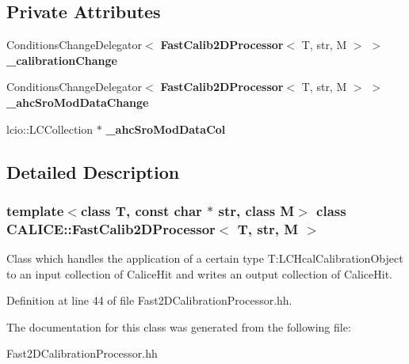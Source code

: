 \subsection*{Private Attributes}
\begin{DoxyCompactItemize}
\item 
ConditionsChangeDelegator$<$ {\bf FastCalib2DProcessor}$<$ T, str, M $>$ $>$ {\bfseries \_\-calibrationChange}\label{classCALICE_1_1FastCalib2DProcessor_a54d843931315ba73e99210c44c5fca78}

\item 
ConditionsChangeDelegator$<$ {\bf FastCalib2DProcessor}$<$ T, str, M $>$ $>$ {\bfseries \_\-ahcSroModDataChange}\label{classCALICE_1_1FastCalib2DProcessor_a407c59825c0f396ed42aa93e2fa1f3b9}

\item 
lcio::LCCollection $\ast$ {\bfseries \_\-ahcSroModDataCol}\label{classCALICE_1_1FastCalib2DProcessor_ae08612f9f4ea6ec8638027e52549fbe7}

\end{DoxyCompactItemize}


\subsection{Detailed Description}
\subsubsection*{template$<$class T, const char $\ast$ str, class M$>$ class CALICE::FastCalib2DProcessor$<$ T, str, M $>$}

Class which handles the application of a certain type T:LCHcalCalibrationObject to an input collection of CaliceHit and writes an output collection of CaliceHit. 

Definition at line 44 of file Fast2DCalibrationProcessor.hh.

The documentation for this class was generated from the following file:\begin{DoxyCompactItemize}
\item 
Fast2DCalibrationProcessor.hh\end{DoxyCompactItemize}
